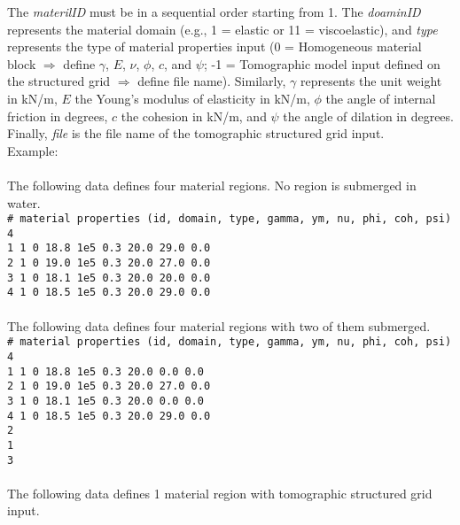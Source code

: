 The \emph{materilID} must be in a sequential order starting from 1. The \emph{doaminID} represents the material domain (e.g., 1 = elastic or 11 = viscoelastic), and \emph{type} represents the type of material properties input (0 = Homogeneous material block $\Rightarrow$ define $\gamma$, $E$, $\nu$, $\phi$, $c$, and $\psi$; -1 = Tomographic model input defined on the structured grid $\Rightarrow$ define file name). Similarly, $\gamma$ represents the unit weight in kN/m, $E$ the Young's modulus of elasticity in kN/m, $\phi$ the angle of internal friction in degrees, $c$ the cohesion in kN/m, and $\psi$ the angle of dilation in degrees. Finally, \emph{file} is the file name of the tomographic structured grid input.\\

Example:\\
\\
The following data defines four material regions. No region is submerged in water.\\

\texttt{\# material properties (id, domain, type, gamma, ym, nu, phi, coh, psi)\\
4\\
1 1 0 18.8 1e5 0.3 20.0 29.0 0.0\\
2 1 0 19.0 1e5 0.3 20.0 27.0 0.0\\
3 1 0 18.1 1e5 0.3 20.0 20.0 0.0\\
4 1 0 18.5 1e5 0.3 20.0 29.0 0.0\\
}\\

The following data defines four material regions with two of them submerged.\\

\texttt{\# material properties (id, domain, type, gamma, ym, nu, phi, coh, psi)\\
4\\
1 1 0 18.8 1e5 0.3 20.0 0.0 0.0\\
2 1 0 19.0 1e5 0.3 20.0 27.0 0.0\\
3 1 0 18.1 1e5 0.3 20.0 0.0 0.0\\
4 1 0 18.5 1e5 0.3 20.0 29.0 0.0\\
2\\
1\\
3\\
}\\

The following data defines 1 material region with tomographic structured grid input.\\

